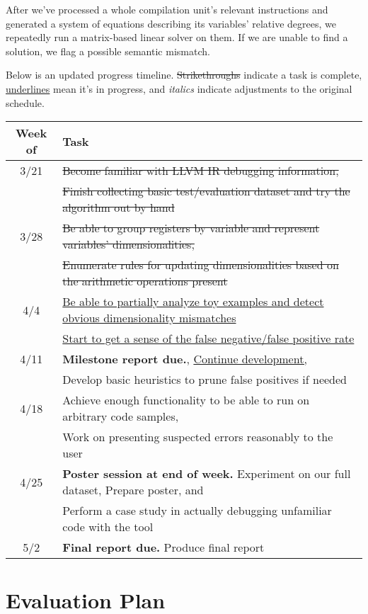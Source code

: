 \documentclass[12pt]{article}
\begin{document}

After we've processed a whole compilation unit's relevant instructions and generated a system of equations describing its variables' relative degrees, we repeatedly run a matrix-based linear solver on them.
If we are unable to find a solution, we flag a possible semantic mismatch.


Below is an updated progress timeline.
\sout{Strikethroughs} indicate a task is complete, \underline{underlines} mean it's in progress, and \textit{italics} indicate adjustments to the original schedule.


\noindent
\begin{tabular}{c | l}
Week of & Task \\
\hline
3/21 & \sout{Become familiar with LLVM IR debugging information,} \\
& \sout{Finish collecting basic test/evaluation dataset and try the algorithm out by hand} \\
3/28 & \sout{Be able to group registers by variable and represent variables' dimensionalities,} \\
& \sout{Enumerate rules for updating dimensionalities based on the arithmetic operations present} \\
4/4 & \underline{Be able to partially analyze toy examples and detect obvious dimensionality mismatches} \\
& \underline{Start to get a sense of the false negative/false positive rate} \\
4/11 & \textbf{Milestone report due.}, \underline{Continue development,} \\
& Develop basic heuristics to prune false positives if needed \\
4/18 & Achieve enough functionality to be able to run on arbitrary code samples, \\
& Work on presenting suspected errors reasonably to the user \\
4/25 & \textbf{Poster session at end of week.} Experiment on our full dataset, Prepare poster, and \\
& Perform a case study in actually debugging unfamiliar code with the tool \\
5/2 & \textbf{Final report due.} Produce final report
\end{tabular}

\section{Evaluation Plan}
\end{document}
